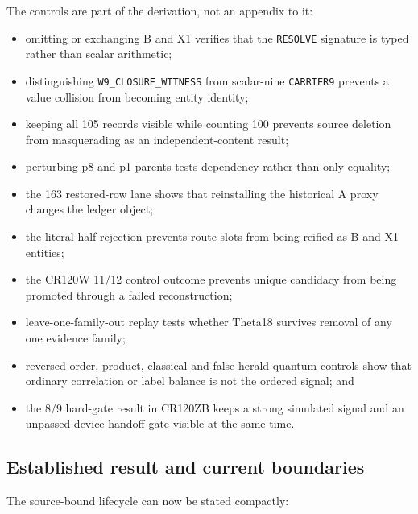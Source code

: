 The controls are part of the derivation, not an appendix to it:

\begin{itemize}
\tightlist
\item
  omitting or exchanging B and X1 verifies that the \texttt{RESOLVE}
  signature is typed rather than scalar arithmetic;
\item
  distinguishing \texttt{W9\_CLOSURE\_WITNESS} from scalar-nine
  \texttt{CARRIER9} prevents a value collision from becoming entity
  identity;
\item
  keeping all 105 records visible while counting 100 prevents source
  deletion from masquerading as an independent-content result;
\item
  perturbing p8 and p1 parents tests dependency rather than only
  equality;
\item
  the 163 restored-row lane shows that reinstalling the historical A
  proxy changes the ledger object;
\item
  the literal-half rejection prevents route slots from being reified as
  B and X1 entities;
\item
  the CR120W 11/12 control outcome prevents unique candidacy from being
  promoted through a failed reconstruction;
\item
  leave-one-family-out replay tests whether Theta18 survives removal of
  any one evidence family;
\item
  reversed-order, product, classical and false-herald quantum controls
  show that ordinary correlation or label balance is not the ordered
  signal; and
\item
  the 8/9 hard-gate result in CR120ZB keeps a strong simulated signal
  and an unpassed device-handoff gate visible at the same time.
\end{itemize}

\subsection{Established result and current
boundaries}\label{viii-ch05-established-result-and-current-boundaries}

The source-bound lifecycle can now be stated compactly:

